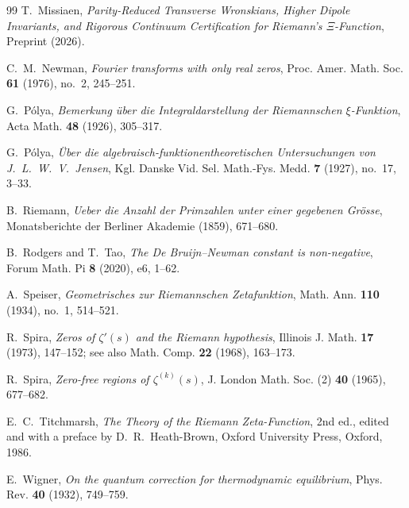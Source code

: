\documentclass[11pt,a4paper,reqno]{amsart}
\theoremstyle{definition}
\theoremstyle{remark}
\numberwithin{equation}{section}
\begin{document}
\begin{thebibliography}{99}
T.~Missiaen, \emph{Parity-Reduced Transverse Wronskians, Higher Dipole Invariants, and Rigorous Continuum Certification for Riemann's $\Xi$-Function}, Preprint (2026).

C.~M.~Newman, \emph{Fourier transforms with only real zeros}, Proc. Amer. Math. Soc. \textbf{61} (1976), no.~2, 245--251.

G.~P\'olya, \emph{Bemerkung \"uber die Integraldarstellung der Riemannschen $\xi$-Funktion}, Acta Math. \textbf{48} (1926), 305--317.

G.~P\'olya, \emph{\"Uber die algebraisch-funktionentheoretischen Untersuchungen von J.~L.~W.~V.~Jensen}, Kgl. Danske Vid. Sel. Math.-Fys. Medd. \textbf{7} (1927), no.~17, 3--33.

B.~Riemann, \emph{Ueber die Anzahl der Primzahlen unter einer gegebenen Gr\"osse}, Monatsberichte der Berliner Akademie (1859), 671--680.

B.~Rodgers and T.~Tao, \emph{The De Bruijn--Newman constant is non-negative}, Forum Math. Pi \textbf{8} (2020), e6, 1--62.

A.~Speiser, \emph{Geometrisches zur Riemannschen Zetafunktion}, Math. Ann. \textbf{110} (1934), no.~1, 514--521.

R.~Spira, \emph{Zeros of $\zeta'(s)$ and the Riemann hypothesis}, Illinois J. Math. \textbf{17} (1973), 147--152; see also Math. Comp. \textbf{22} (1968), 163--173.

R.~Spira, \emph{Zero-free regions of $\zeta^{(k)}(s)$}, J. London Math. Soc. (2) \textbf{40} (1965), 677--682.

E.~C.~Titchmarsh, \emph{The Theory of the Riemann Zeta-Function}, 2nd ed., edited and with a preface by D.~R.~Heath-Brown, Oxford University Press, Oxford, 1986.

E.~Wigner, \emph{On the quantum correction for thermodynamic equilibrium}, Phys. Rev. \textbf{40} (1932), 749--759.

\end{thebibliography}
\end{document}
